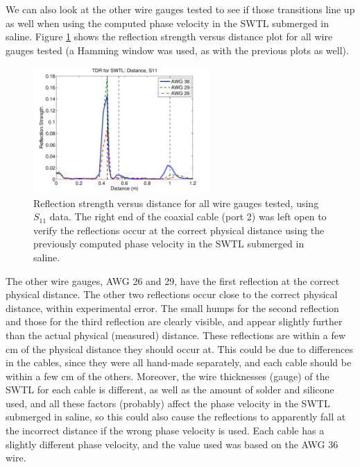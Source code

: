 \documentclass[12pt,onecolumn,titlepage]{article}
\begin{document}
We can also look at the other wire gauges tested to see if those transitions line up as well when using the computed phase velocity in the SWTL submerged in saline. Figure \ref{fig:SWTL_TDR_s11_dist_all_wires_vpverify} shows the reflection strength versus distance plot for all wire gauges tested (a Hamming window was used, as with the previous plots as well). 




\begin{figure}[htbp]
	\centering
	\includegraphics[width=0.6\textwidth]{Pictures/22July2013/SWTL_TDR_s11_dist_all_wires_vpverify}
	\caption{ Reflection strength versus distance for all wire gauges tested, using $S_{11}$ data. The right end of the coaxial cable (port 2) was left open to verify the reflections occur at the correct physical distance using the previously computed phase velocity in the SWTL submerged in saline. } 
	\label{fig:SWTL_TDR_s11_dist_all_wires_vpverify}
\end{figure}



The other wire gauges, AWG 26 and 29, have the first reflection at the correct physical distance. The other two reflections occur close to the correct physical distance, within experimental error. The small humps for the second reflection and those for the third reflection are clearly visible, and appear slightly further than the actual physical (measured) distance. These reflections are within a few cm of the physical distance they should occur at. This could be due to differences in the cables, since they were all hand-made separately, and each cable should be within a few cm of the others. Moreover, the wire thicknesses (gauge) of the SWTL for each cable is different, as well as the amount of solder and silicone used, and all these factors (probably) affect the phase velocity in the SWTL submerged in saline, so this could also cause the reflections to apparently fall at the incorrect distance if the wrong phase velocity is used. Each cable has a slightly different phase velocity, and the value used was based on the AWG 36 wire. 
\end{document}
